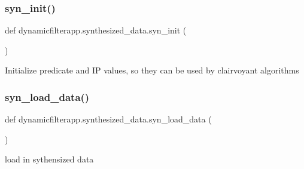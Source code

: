 \subsubsection{\texorpdfstring{syn\_init()}{syn\_init()}}
{\footnotesize\ttfamily def dynamicfilterapp.\+synthesized\+\_\+data.\+syn\+\_\+init (\begin{DoxyParamCaption}{ }\end{DoxyParamCaption})}

\begin{DoxyVerb}Initialize predicate and IP values, so they can be used by clairvoyant algorithms
\end{DoxyVerb}
 \mbox{\label{namespacedynamicfilterapp_1_1synthesized__data_af2a5ccfeb2728fbcc461071a4755b1c9}} 
\subsubsection{\texorpdfstring{syn\_load\_data()}{syn\_load\_data()}}
{\footnotesize\ttfamily def dynamicfilterapp.\+synthesized\+\_\+data.\+syn\+\_\+load\+\_\+data (\begin{DoxyParamCaption}{ }\end{DoxyParamCaption})}

\begin{DoxyVerb}load in sythensized data
\end{DoxyVerb}
 
